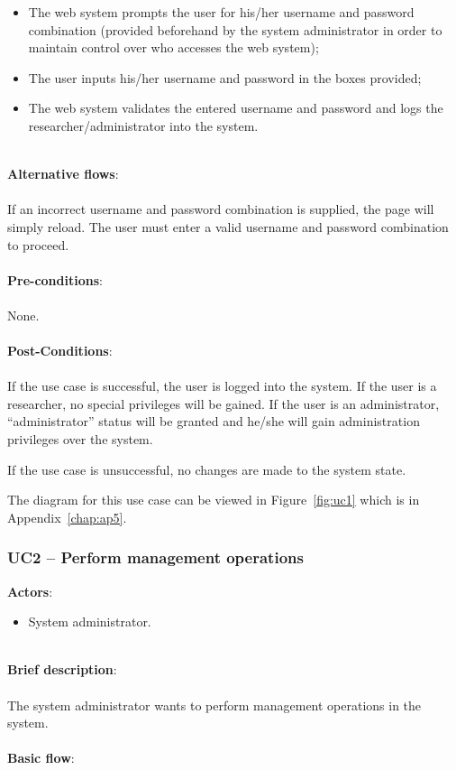 \begin{itemize}
\item The web system prompts the user for his/her username and password combination (provided beforehand by the system administrator in order to maintain control over who accesses the web system);
\item The user inputs his/her username and password in the boxes provided;
\item The web system validates the entered username and password and logs the researcher/administrator into the system.
\end{itemize}

\ \\
\textbf{Alternative flows}:\\
\ \\
If an incorrect username and password combination is supplied, the page will simply reload. The user must enter a valid username and password combination to proceed.\\
\ \\
\textbf{Pre-conditions}:\\
\ \\
None.\\
\ \\
\textbf{Post-Conditions}:\\
\ \\
If the use case is successful, the user is logged into the system. If the user is a researcher, no special privileges will be gained. If the user is an administrator, ``administrator'' status will be granted and he/she will gain administration privileges over the system.

If the use case is unsuccessful, no changes are made to the system state.

The diagram for this use case can be viewed in Figure~\ref{fig:uc1} which is in Appendix~\ref{chap:ap5}.

\subsubsection{UC2 -- Perform management operations}\label{uc2}

\textbf{Actors}:

\begin{itemize}
\item System administrator.
\end{itemize}

\ \\
\textbf{Brief description}:\\
\ \\
The system administrator wants to perform management operations in the system.\\
\ \\
\textbf{Basic flow}:

